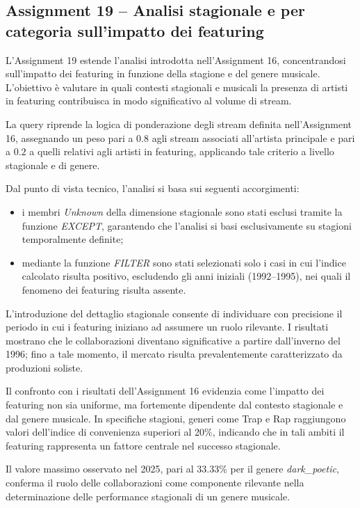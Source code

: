 \subsection*{Assignment 19 -- Analisi stagionale e per categoria sull’impatto dei featuring}

L’Assignment 19 estende l’analisi introdotta nell’Assignment 16, concentrandosi
sull’impatto dei featuring in funzione della stagione e del genere musicale.
L’obiettivo è valutare in quali contesti stagionali e musicali la presenza di
artisti in featuring contribuisca in modo significativo al volume di stream.

La query riprende la logica di ponderazione degli stream definita
nell’Assignment 16, assegnando un peso pari a $0.8$ agli stream associati
all’artista principale e pari a $0.2$ a quelli relativi agli artisti in
featuring, applicando tale criterio a livello stagionale e di genere.

Dal punto di vista tecnico, l’analisi si basa sui seguenti accorgimenti:
\begin{itemize}
    \item i membri \textit{Unknown} della dimensione stagionale sono stati esclusi
    tramite la funzione \textit{EXCEPT}, garantendo che l’analisi si basi
    esclusivamente su stagioni temporalmente definite;
    \item mediante la funzione \textit{FILTER} sono stati selezionati solo i casi
    in cui l’indice calcolato risulta positivo, escludendo gli anni iniziali
    (1992--1995), nei quali il fenomeno dei featuring risulta assente.
\end{itemize}

L’introduzione del dettaglio stagionale consente di individuare con precisione il
periodo in cui i featuring iniziano ad assumere un ruolo rilevante. I risultati
mostrano che le collaborazioni diventano significative a partire dall’inverno
del 1996; fino a tale momento, il mercato risulta prevalentemente caratterizzato
da produzioni soliste.

Il confronto con i risultati dell’Assignment 16 evidenzia come l’impatto dei
featuring non sia uniforme, ma fortemente dipendente dal contesto stagionale e
dal genere musicale. In specifiche stagioni, generi come Trap e Rap raggiungono
valori dell’indice di convenienza superiori al 20\%, indicando che in tali ambiti
il featuring rappresenta un fattore centrale nel successo stagionale.

Il valore massimo osservato nel 2025, pari al 33.33\% per il genere
\textit{dark\_poetic}, conferma il ruolo delle collaborazioni come componente
rilevante nella determinazione delle performance stagionali di un genere
musicale.
